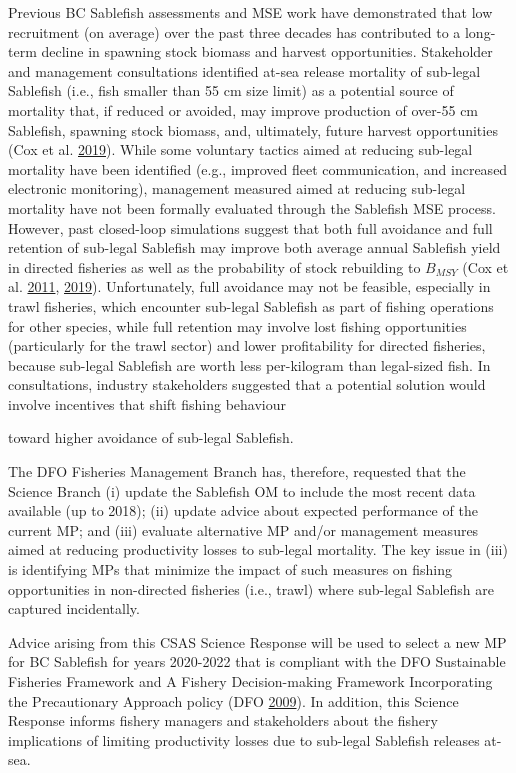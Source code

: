 \documentclass[11pt]{book}
\begin{document}
Previous BC Sablefish assessments and MSE work have demonstrated that low recruitment (on average) over the past three decades has contributed to a long-term decline in spawning stock biomass and harvest opportunities. Stakeholder and management consultations identified at-sea release mortality of sub-legal Sablefish (i.e., fish smaller than 55 cm size limit) as a potential source of mortality that, if reduced or avoided, may improve production of over-55 cm Sablefish, spawning stock biomass, and, ultimately, future harvest opportunities (Cox et al. \protect\hyperlink{ref-cox2019evaluating}{2019}). While some voluntary tactics aimed at reducing sub-legal mortality have been identified (e.g., improved fleet communication, and increased electronic monitoring), management measured aimed at reducing sub-legal mortality have not been formally evaluated through the Sablefish MSE process. However, past closed-loop simulations suggest that both full avoidance and full retention of sub-legal Sablefish may improve both average annual Sablefish yield in directed fisheries as well as the probability of stock rebuilding to \(B_{MSY}\) (Cox et al. \protect\hyperlink{ref-cox2011management}{2011}, \protect\hyperlink{ref-cox2019evaluating}{2019}). Unfortunately, full avoidance may not be feasible, especially in trawl fisheries, which encounter sub-legal Sablefish as part of fishing operations for other species, while full retention may involve lost fishing opportunities (particularly for the trawl sector) and lower profitability for directed fisheries, because sub-legal Sablefish are worth less per-kilogram than legal-sized fish. In consultations, industry stakeholders suggested that a potential solution would involve incentives that shift fishing behaviour

toward higher avoidance of sub-legal Sablefish.

The DFO Fisheries Management Branch has, therefore, requested that the Science Branch (i) update the Sablefish OM to include the most recent data available (up to 2018); (ii) update advice about expected performance of the current MP; and (iii) evaluate alternative MP and/or management measures aimed at reducing productivity losses to sub-legal mortality. The key issue in (iii) is identifying MPs that minimize the impact of such measures on fishing opportunities in non-directed fisheries (i.e., trawl) where sub-legal Sablefish are captured incidentally.

Advice arising from this CSAS Science Response will be used to select a new MP for BC Sablefish for years 2020-2022 that is compliant with the DFO Sustainable Fisheries Framework and A Fishery Decision-making Framework Incorporating the Precautionary Approach policy (DFO \protect\hyperlink{ref-DFO2009}{2009}). In addition, this Science Response informs fishery managers and stakeholders about the fishery implications of limiting productivity losses due to sub-legal Sablefish releases at-sea.
\end{document}
